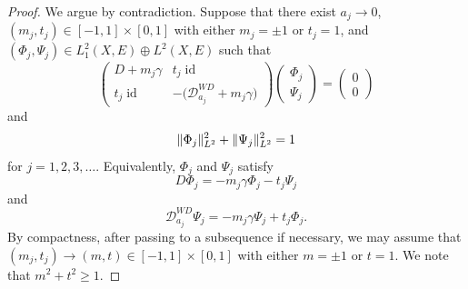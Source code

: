 \documentclass[a4paper,oneside,12pt]{amsart}
\theoremstyle{plain}
\theoremstyle{definition}
\theoremstyle{remark}
\DeclarePairedDelimiter{\norm}{\lVert}{\rVert}
\DeclareMathOperator{\id}{id}
\newcommand{\Ltwonorm}[2][L^2]{\norm{#2}_{#1}}
\newcommand{\mesoscopicWilsonDiracoperator}[1][a]{\mathcal{D}_{#1}^{\mathit{WD}}}
\begin{document}
\begin{proof}
  We argue by contradiction.
  Suppose that there exist $a_j \to 0$, $(m_j,t_j) \in [-1,1] \times [0,1]$ with either $m_j = \pm 1$ or $t_j = 1$, and $(\Phi_j,\Psi_j) \in L^2_1(X,E) \oplus L^2(X,E)$ such that
  \begin{equation}
    \begin{pmatrix}
      D+m_j\gamma & t_j \id \\
      t_j \id & -\bigl(\mesoscopicWilsonDiracoperator[a_j] + m_j\gamma\bigr)
    \end{pmatrix}
    \begin{pmatrix}
      \Phi_j \\
      \Psi_j
    \end{pmatrix}
    =
    \begin{pmatrix}
      0 \\
      0
    \end{pmatrix}
  \end{equation}
  and
  \begin{equation}\label{equation: contradiction normalisation}
    \Ltwonorm{\Phi_j}^2 + \Ltwonorm{\Psi_j}^2 = 1
  \end{equation}
  for $j = 1,2,3,\dots$.
  Equivalently, $\Phi_j$ and $\Psi_j$ satisfy
  \begin{equation}\label{equation: contradiction DPhi equation}
    D \Phi_j = - m_j \gamma \Phi_j - t_j \Psi_j
  \end{equation}
  and
  \begin{equation}\label{equation: contradiction WDPsi equation}
    \mesoscopicWilsonDiracoperator[a_j] \Psi_j = -m_j \gamma \Psi_j + t_j\Phi_j.
  \end{equation}
  By compactness, after passing to a subsequence if necessary, we may assume that $(m_j,t_j) \to (m,t) \in [-1,1] \times [0,1]$ with either $m = \pm 1$ or $t = 1$.
  We note that $m^2 + t^2 \ge 1$.


\end{proof}
\end{document}
